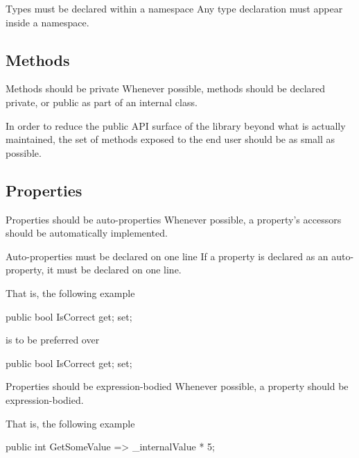 \documentclass[11pt,a4paper]{article}
\begin{document}
\begin{must}{Types must be declared within a namespace}
Any type declaration must appear inside a namespace.
\end{must}

\subsection{Methods}
\begin{should}{Methods should be private}
Whenever possible, methods should be declared private, or public as part of an internal class.
\end{should}

In order to reduce the public API surface of the library beyond what is actually maintained, the set of methods exposed to the end user should be as small as possible.

\subsection{Properties}
\begin{should}{Properties should be auto-properties}
Whenever possible, a property's accessors should be automatically implemented.
\end{should}

\begin{must}{Auto-properties must be declared on one line}
If a property is declared as an auto-property, it must be declared on one line.
\end{must}

That is, the following example 
\begin{code}
public bool IsCorrect { get; set; }
\end{code}

is to be preferred over

\begin{code}
public bool IsCorrect 
{
    get; 
    set; 
}
\end{code}

\begin{should}{Properties should be expression-bodied}
Whenever possible, a property should be expression-bodied.
\end{should}

That is, the following example 
\begin{code}
public int GetSomeValue => _internalValue * 5;
\end{code}
\end{document}
